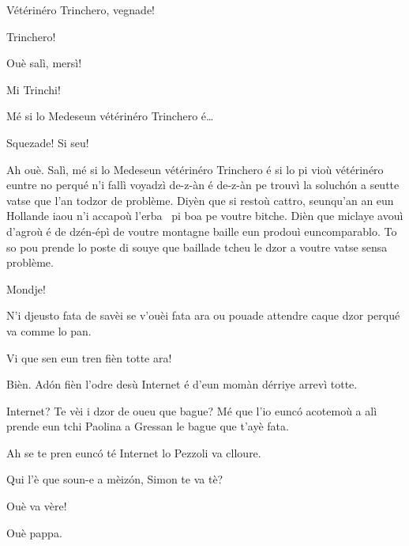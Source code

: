\begin{drama}

\Chefspeaks Vétérinéro Trinchero, vegnade!


\Tuttispeaks Trinchero!


\Trincherospeaks{} Ouè salì, mersì!

\Mariettospeaks Mi Trinchi!

\Trincherospeaks{} Mé si lo Medeseun vétérinéro Trinchero é\ldots

\Cienspeaks Squezade! Si seu!


\Trincherospeaks Ah ouè.  Salì, mé si lo Medeseun vétérinéro Trinchero é si lo pi vioù vétérinéro euntre no perqué n’i fallì voyadzì de-z-àn é de-z-àn pe trouvì la soluch\'on a seutte vatse que l’an todzor de problème. Diyèn que si restoù cattro, seunqu'an an eun Hollande iaou n’i accapoù l’erba \cannabis\ pi boa pe voutre bitche. Dièn que miclaye avouì d’agroù é de dzén-épì de voutre montagne baille eun prodouì euncomparablo. To so pou prende lo poste di souye que baillade tcheu le dzor a voutre vatse sensa problème.

\Cienspeaks Mondje!

\Trincherospeaks N’i djeusto fata de savèi se v'ouèi fata ara ou pouade attendre caque dzor perqué va comme lo pan.

\Cienspeaks Vi que sen eun tren fièn totte ara!

\Trincherospeaks Bièn. Ad\'on fièn l’odre desù Internet é d’eun momàn dérriye arrevì totte.


\Cienspeaks {} Internet? Te vèi i dzor de oueu que bague? Mé que l'io eunc\'o acotemoù a alì prende eun tchi Paolina a Gressan le bague que t’ayè fata. 

\Mariettospeaks Ah se te pren eunc\'o té Internet lo Pezzoli va clloure.


\Cienspeaks Qui l'è que soun-e a mèiz\'on, Simon te va tè?

\Mariettospeaks Ouè va vère!

\Simonspeaks Ouè pappa. 


\end{drama}
